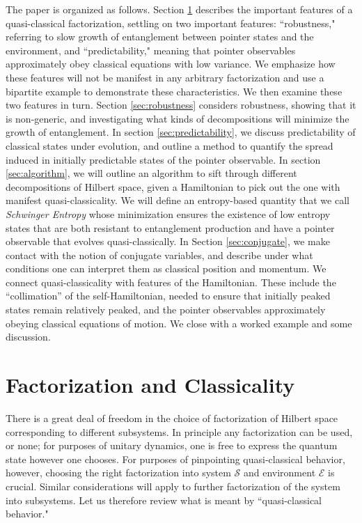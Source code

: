 \documentclass[aps,pra,onecolumn,nofootinbib,11pt,tightenlines]{revtex4-1}
\begin{document}
The paper is organized as follows. Section \ref{sec:qc_factorization} describes the important features of a quasi-classical factorization, settling on two important features: ``robustness," referring to slow growth of entanglement between pointer states and the environment, and ``predictability," meaning that pointer observables approximately obey classical equations with low variance.
We emphasize how these features will not be manifest in any arbitrary factorization and use a bipartite example to demonstrate these characteristics.
We then examine these two features in turn.
Section \ref{sec:robustness} considers robustness, showing that it is non-generic, and investigating what kinds of decompositions will minimize the growth of entanglement.
In section \ref{sec:predictability}, we discuss predictability of classical states under evolution, and outline a method to quantify the spread induced in initially predictable states of the pointer observable.
In section \ref{sec:algorithm}, we will outline an algorithm to sift through different decompositions of Hilbert space, given a Hamiltonian to pick out the one with manifest quasi-classicality. We will define an entropy-based quantity that we call \emph{Schwinger Entropy} whose minimization ensures the existence of low entropy states that are both resistant to entanglement production and have a pointer observable that evolves quasi-classically. In Section \ref{sec:conjugate}, we make contact with the notion of conjugate variables, and describe under what conditions one can interpret them as classical position and momentum. We connect quasi-classicality with features of the Hamiltonian. These include the ``collimation'' of the self-Hamiltonian, needed to ensure that initially peaked states remain relatively peaked, and the pointer observables approximately obeying classical equations of motion.
We close with a worked example and some discussion.


\section{Factorization and Classicality}
\label{sec:qc_factorization}


There is a great deal of freedom in the choice of factorization of Hilbert space corresponding to different subsystems.
In principle any factorization can be used, or none; for purposes of unitary dynamics, one is free to express the quantum state however one chooses.
For purposes of pinpointing quasi-classical behavior, however, choosing the right factorization into system $\mathcal{S}$ and environment $\mathcal{E}$ is crucial.
Similar considerations will apply to further factorization of the system into subsystems.
Let us therefore review what is meant by ``quasi-classical behavior."
\end{document}
